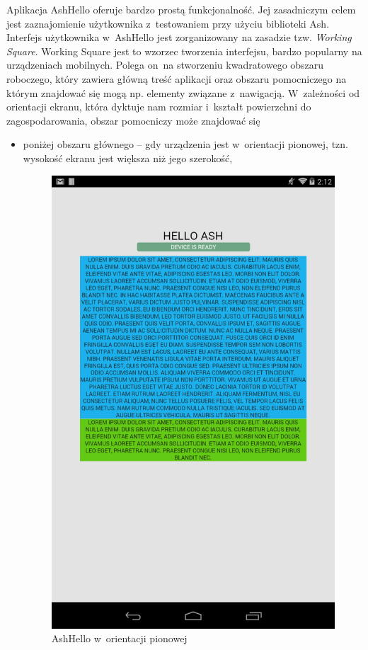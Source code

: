 \documentclass[brudnopis]{xmgr}
\begin{document}
Aplikacja AshHello oferuje bardzo prostą funkcjonalność. Jej zasadniczym celem jest zaznajomienie użytkownika z~testowaniem przy użyciu biblioteki Ash. Interfejs użytkownika w~AshHello jest zorganizowany na zasadzie tzw. {\it Working Square}. Working Square jest to wzorzec tworzenia interfejsu, bardzo popularny na urządzeniach mobilnych. Polega on~na stworzeniu kwadratowego obszaru roboczego, który zawiera główną treść aplikacji oraz obszaru pomocniczego na którym znajdować się mogą np. elementy związane z~nawigacją. W~zależności od orientacji ekranu, która dyktuje nam rozmiar i~kształt powierzchni do zagospodarowania, obszar pomocniczy może znajdować się 

\begin{itemize}
  \item poniżej obszaru głównego -- gdy urządzenia jest w~orientacji pionowej, tzn. wysokość ekranu jest większa niż jego szerokość,

\begin{figure}[h]
    \centering
    \includegraphics[scale=0.25]{hello1.png}
    \caption{AshHello w~orientacji pionowej}
    \label{fig:AshHello1}
\end{figure}


\end{itemize}
\end{document}
